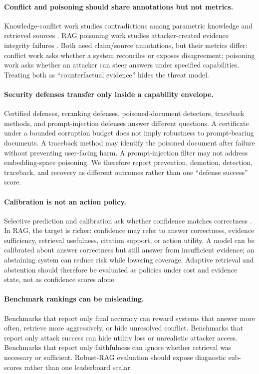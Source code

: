 \documentclass[11pt]{article}
\begin{document}
\paragraph{Conflict and poisoning should share annotations but not metrics.}
Knowledge-conflict work studies contradictions among parametric knowledge and retrieved sources \citep{tugOfWar2024,faithfulRAG2025,astuteRAG2025}. RAG poisoning work studies attacker-created evidence integrity failures \citep{poisoningRetrievalCorpora2023,poisonedRAG2024,badRAG2024}. Both need claim/source annotations, but their metrics differ: conflict work asks whether a system reconciles or exposes disagreement; poisoning work asks whether an attacker can steer answers under specified capabilities. Treating both as ``counterfactual evidence'' hides the threat model.

\paragraph{Security defenses transfer only inside a capability envelope.}
Certified defenses, reranking defenses, poisoned-document detectors, traceback methods, and prompt-injection defenses answer different questions. A certificate under a bounded corruption budget does not imply robustness to prompt-bearing documents. A traceback method may identify the poisoned document after failure without preventing user-facing harm. A prompt-injection filter may not address embedding-space poisoning. We therefore report prevention, demotion, detection, traceback, and recovery as different outcomes rather than one ``defense success'' score.

\paragraph{Calibration is not an action policy.}
Selective prediction and calibration ask whether confidence matches correctness \citep{geifman2017selective,guo2017calibration}. In RAG, the target is richer: confidence may refer to answer correctness, evidence sufficiency, retrieval usefulness, citation support, or action utility. A model can be calibrated about answer correctness but still answer from insufficient evidence; an abstaining system can reduce risk while lowering coverage. Adaptive retrieval and abstention should therefore be evaluated as policies under cost and evidence state, not as confidence scores alone.

\paragraph{Benchmark rankings can be misleading.}
Benchmarks that report only final accuracy can reward systems that answer more often, retrieve more aggressively, or hide unresolved conflict. Benchmarks that report only attack success can hide utility loss or unrealistic attacker access. Benchmarks that report only faithfulness can ignore whether retrieval was necessary or sufficient. Robust-RAG evaluation should expose diagnostic sub-scores rather than one leaderboard scalar.
\end{document}
